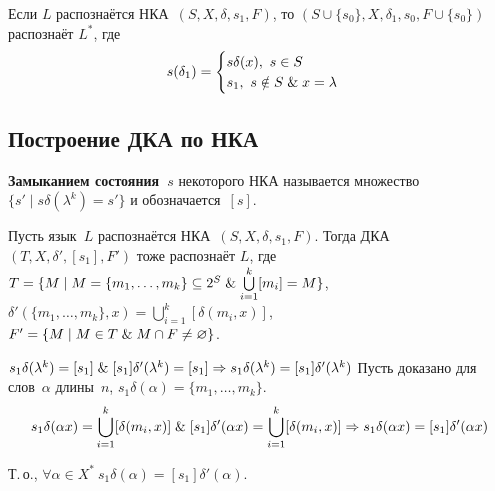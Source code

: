 Если $L$ распознаётся НКА~$(S, X, \delta, s_1, F)$, то $(S \cup \{ s_0 \}, X, \delta_1, s_0, F \cup \{ s_0 \})$ распознаёт $L^*$, где
\begin{equation*}
s(\delta_1) =
\begin{cases}
s \delta(x), \ s \in S \\
s_1, \ s \notin S \mathrel{\&} x = \lambda
\end{cases}
\end{equation*}

\subsection{Построение ДКА по НКА}
 \textbf{Замыканием состояния~$s$} некоторого НКА называется множество~$\{ s' \mid s \delta(\lambda^k) = s' \}$ и обозначается~$[s]$.

Пусть язык~$L$ распознаётся НКА~$(S, X, \delta, s_1, F)$.
Тогда ДКА~$(T, X, \delta', [s_1], F')$ тоже распознаёт $L$, где\\
$T = \{ M \mid M = \{ m_1, \ldots, m_k \} \subseteq 2^S \mathrel{\&} \bigcup\limits_{i=1}^k [m_i] = M \}$,\\
$\delta'(\{ m_1, \ldots, m_k \}, x) = \bigcup\limits_{i=1}^k [\delta(m_i, x)]$,\\
$F' = \{ M \mid M \in T \mathrel{\&} M \cap F \neq \varnothing \}$.
\begin{proofmathind}
	\indbase $s_1 \delta(\lambda^k) = [s_1] \mathrel{\&} [s_1] \delta'(\lambda^k) = [s_1] \Rightarrow
	s_1 \delta(\lambda^k) = [s_1] \delta'(\lambda^k)$
	\indstep Пусть доказано для слов~$\alpha$ длины~$n$, $s_1 \delta(\alpha) = \{ m_1, \ldots, m_k \}$.
	\begin{equation*}
	s_1 \delta(\alpha x) = \bigcup_{i=1}^k [\delta(m_i, x)] \mathrel{\&}
	[s_1] \delta'(\alpha x) = \bigcup_{i=1}^k [\delta(m_i, x)] \Rightarrow
	s_1 \delta(\alpha x) = [s_1] \delta'(\alpha x)
	\end{equation*}
	\indend
	
Т.\,о., $\forall \alpha \in X^* \ s_1 \delta(\alpha) = [s_1] \delta'(\alpha)$.
\end{proofmathind}